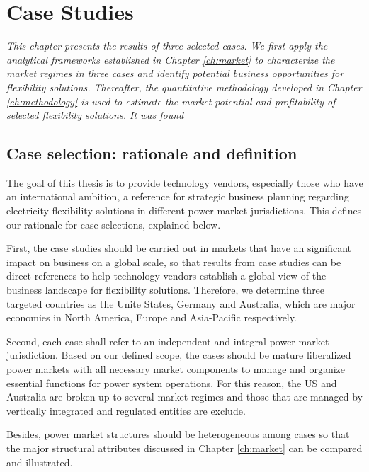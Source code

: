 \chapter{Case Studies}
\label{ch:cases}

\textit{This chapter presents the results of three selected cases. We first apply the analytical frameworks established in Chapter \ref{ch:market} to characterize the market regimes in three cases and identify potential business opportunities for flexibility solutions. Thereafter, the quantitative methodology developed in Chapter \ref{ch:methodology} is used to estimate the market potential and profitability of selected flexibility solutions. It was found}

\section[Case selection: rationale and definition]{Case selection: rationale and definition%
	}
The goal of this thesis is to provide technology vendors, especially those who have an international ambition, a reference for strategic business planning regarding electricity flexibility solutions in different power market jurisdictions. This defines our rationale for case selections, explained below.

First, the case studies should be carried out in markets that have an significant impact on business on a global scale, so that results from case studies can be direct references to help technology vendors establish a global view of the business landscape for flexibility solutions. Therefore, we determine three targeted countries as the Unite States, Germany and Australia, which are major economies in North America, Europe and Asia-Pacific respectively.

Second, each case shall refer to an independent and integral power market jurisdiction. Based on our defined scope, the cases should be mature liberalized power markets with all necessary market components to manage and organize essential functions for power system operations. For this reason, the US and Australia are broken up to several market regimes and those that are managed by vertically integrated and regulated entities are exclude.

Besides, power market structures should be heterogeneous among cases so that the major structural attributes discussed in Chapter \ref{ch:market} can be compared and illustrated. 

